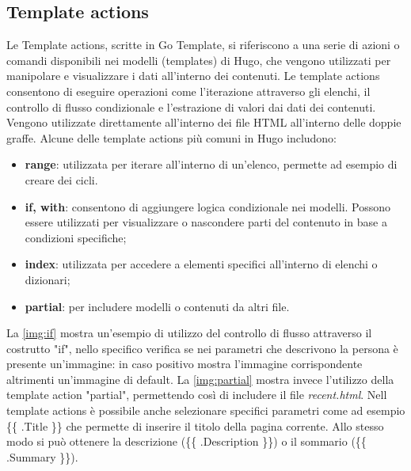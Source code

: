 \documentclass[target=bach,aauheader=]{thud}
\begin{document}
\subsection{Template actions}
Le Template actions, scritte in Go Template, si riferiscono a una serie di azioni o comandi disponibili nei modelli (templates) di Hugo, che vengono utilizzati per manipolare e visualizzare i dati all'interno dei contenuti. 
Le template actions consentono di eseguire operazioni come l'iterazione attraverso gli elenchi, il controllo di flusso condizionale e l'estrazione di valori dai dati dei contenuti. Vengono utilizzate direttamente all'interno dei file HTML all'interno delle doppie graffe. \newline
Alcune delle template actions più comuni in Hugo includono:
\begin{itemize}
    \item \textbf{range}: utilizzata per iterare all'interno di un'elenco, permette ad esempio di creare dei cicli.
    \item \textbf{if, with}: consentono di aggiungere logica condizionale nei modelli. Possono essere utilizzati per visualizzare o nascondere parti del contenuto in base a condizioni specifiche;
    \item \textbf{index}: utilizzata per accedere a elementi specifici all'interno di elenchi o dizionari;
    \item \textbf{partial}: per includere modelli o contenuti da altri file. 
\end{itemize}

La \cref{img:if} mostra un'esempio di utilizzo del controllo di flusso attraverso il costrutto "if", nello specifico verifica se nei parametri che descrivono la persona è presente un'immagine: in caso positivo mostra l'immagine corrispondente altrimenti un'immagine di default.
La \cref{img:partial} mostra invece l'utilizzo della template action "partial", permettendo così di includere il file \textit{recent.html}. \newline 
Nell template actions è possibile anche selezionare specifici parametri come ad esempio \{\{ .Title \}\} che permette di inserire il titolo della pagina corrente. Allo stesso modo si può ottenere la descrizione (\{\{ .Description \}\}) o il sommario (\{\{ .Summary \}\}).
\end{document}
